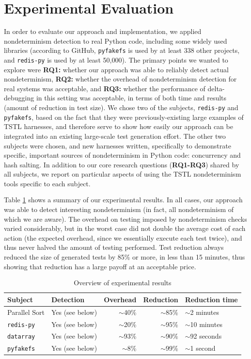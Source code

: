 \section{Experimental Evaluation}

In order to evaluate our approach and implementation, we applied
nondeterminism detection to real Python code, including some widely
used libraries (according to GitHub, {\tt pyfakefs} is used by at least
338 other projects, and {\tt redis-py} is used by at least 50,000).  The primary
points we wanted to explore were {\bf RQ1:} whether our approach was able to reliably detect actual
nondeterminism, {\bf RQ2:} whether the overhead of nondeterminism
detection for real systems was acceptable, and {\bf RQ3:} whether the performance of
delta-debugging in this setting was acceptable, in terms of both time
and results (amount of reduction in test size).  We chose two of
the subjects, {\tt redis-py} and {\tt pyfakefs}, based on the fact that they were previously-existing large
examples of TSTL harnesses, and therefore serve to show how easily our
approach can be integrated into an existing large-scale test
generation effort.  The other two subjects were chosen, and new harnesses
written, specifically to demonstrate specific, important sources of
nondeterminism in Python code: concurrency and hash salting.  In
addition to our core research questions ({\bf RQ1-RQ3}) shared by all subjects, we
report on particular aspects of using the TSTL nondeterminism tools
specific to each subject.

Table \ref{tab:overviewexp} shows a summary of our experimental
results.  In all cases, our approach was able to detect interesting
nondeterminism (in fact, all nondeterminism of which we are aware).  The overhead on testing imposed by nondeterminism
checks varied considerably, but in the worst case did not double the
average cost of each action (the expected overhead, since we
essentially execute each test twice), and thus never halved the amount of
testing performed.  Test reduction always reduced the size of
generated tests by 85\% or more, in less than 15 minutes, thus showing that reduction
has a large payoff at an acceptable price.

\begin{table}
\centering
\begin{tabular}{l|l|r|r|l}
Subject & Detection & Overhead & Reduction & Reduction time \\
\hline
Parallel Sort & Yes (see below) & $\sim$40\% & $\sim$85\% & $\sim$2 minutes\\
{\tt redis-py} & Yes (see below) & $\sim$20\% & $\sim$95\% & $\sim$10 minutes\\
{\tt datarray} & Yes (see below) & $\sim$93\% & $\sim$90\% & $\sim$92
  seconds\\
{\tt pyfakefs} & Yes (see below) & $\sim$8\% & $\sim$99\% & $\sim$1 second  \\
\end{tabular}
\caption{Overview of experimental results}
\label{tab:overviewexp}
\end{table}

